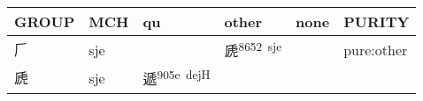 \documentclass[14pt,a4paper]{scrartcl}
\begin{document}
\begin{longtable}[c]{@{}llllll@{}}
\toprule
\begin{minipage}[b]{0.14\columnwidth}\raggedright\strut
GROUP
\strut\end{minipage} &
\begin{minipage}[b]{0.14\columnwidth}\raggedright\strut
MCH
\strut\end{minipage} &
\begin{minipage}[b]{0.14\columnwidth}\raggedright\strut
qu
\strut\end{minipage} &
\begin{minipage}[b]{0.14\columnwidth}\raggedright\strut
other
\strut\end{minipage} &
\begin{minipage}[b]{0.14\columnwidth}\raggedright\strut
none
\strut\end{minipage} &
\begin{minipage}[b]{0.14\columnwidth}\raggedright\strut
PURITY
\strut\end{minipage}\tabularnewline
\midrule
\endhead
\begin{minipage}[t]{0.14\columnwidth}\raggedright\strut
𠂆
\strut\end{minipage} &
\begin{minipage}[t]{0.14\columnwidth}\raggedright\strut
sje
\strut\end{minipage} &
\begin{minipage}[t]{0.14\columnwidth}\raggedright\strut
\strut\end{minipage} &
\begin{minipage}[t]{0.14\columnwidth}\raggedright\strut
虒\textsuperscript{8652~sje}
\strut\end{minipage} &
\begin{minipage}[t]{0.14\columnwidth}\raggedright\strut
\strut\end{minipage} &
\begin{minipage}[t]{0.14\columnwidth}\raggedright\strut
pure:other
\strut\end{minipage}\tabularnewline
\begin{minipage}[t]{0.14\columnwidth}\raggedright\strut
虒
\strut\end{minipage} &
\begin{minipage}[t]{0.14\columnwidth}\raggedright\strut
sje
\strut\end{minipage} &
\begin{minipage}[t]{0.14\columnwidth}\raggedright\strut
遞\textsuperscript{905e~dejH}
\strut\end{minipage} &

\end{longtable}
\end{document}
